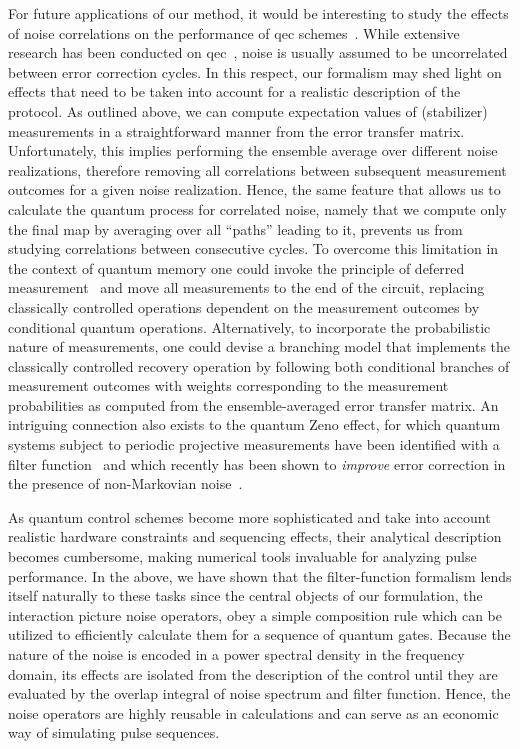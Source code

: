 For future applications of our method, it would be interesting to study the effects of noise correlations on the performance of \gls{qec} schemes~\cite{Devitt2013,Ng2011,Nickerson2019,Clader2021,Liu2024a}.
While extensive research has been conducted on \gls{qec}~\cite{Terhal2015}, noise is usually assumed to be uncorrelated between error correction cycles.
In this respect, our formalism may shed light on effects that need to be taken into account for a realistic description of the protocol.
As outlined above, we can compute expectation values of (stabilizer) measurements in a straightforward manner from the error transfer matrix.
Unfortunately, this implies performing the ensemble average over different noise realizations, therefore removing all correlations between subsequent measurement outcomes for a given noise realization.
Hence, the same feature that allows us to calculate the quantum process for correlated noise, namely that we compute only the final map by averaging over all \enquote{paths} leading to it, prevents us from studying correlations between consecutive cycles.
To overcome this limitation in the context of quantum memory one could invoke the principle of deferred measurement~\cite{Nielsen2011} and move all measurements to the end of the circuit, replacing classically controlled operations dependent on the measurement outcomes by conditional quantum operations.
Alternatively, to incorporate the probabilistic nature of measurements, one could devise a branching model that implements the classically controlled recovery operation by following both conditional branches of measurement outcomes with weights corresponding to the measurement probabilities as computed from the ensemble-averaged error transfer matrix.
An intriguing connection also exists to the quantum Zeno effect, for which quantum systems subject to periodic projective measurements have been identified with a filter function~\cite{Kofman2000,Kofman2001,Chaudhry2016} and which recently has been shown to \emph{improve} error correction in the presence of non-Markovian noise~\cite{Nila2026}.

As quantum control schemes become more sophisticated and take into account realistic hardware constraints and sequencing effects, their analytical description becomes cumbersome, making numerical tools invaluable for analyzing pulse performance.
In the above, we have shown that the filter-function formalism lends itself naturally to these tasks since the central objects of our formulation, the interaction picture noise operators, obey a simple composition rule which can be utilized to efficiently calculate them for a sequence of quantum gates.
Because the nature of the noise is encoded in a power spectral density in the frequency domain, its effects are isolated from the description of the control until they are evaluated by the overlap integral of noise spectrum and filter function.
Hence, the noise operators are highly reusable in calculations and can serve as an economic way of simulating pulse sequences.

